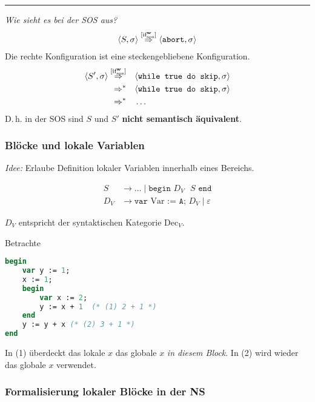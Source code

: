 \begin{lemma}[Determiniertheit]
\begin{example}
    \par\bigskip
    \hrule
    \emph{Wie sieht es bei der SOS aus?}
    \begin{align*}
        \langle S, \sigma \rangle \overset{\infruleSos[\true]{if}}{\Rightarrow} \langle \texttt{abort}, \sigma \rangle
    \end{align*}
    Die rechte Konfiguration ist eine steckengebliebene Konfiguration.
    \begin{align*}
        \langle S', \sigma \rangle \overset{\infruleSos[\true]{if}}{\Rightarrow} & \quad \langle \texttt{while true do skip}, \sigma \rangle \\
        \Rightarrow^* & \quad \langle \texttt{while true do skip}, \sigma \rangle \\
        \Rightarrow^* & \quad \dots
    \end{align*}
    D.\,h. in der SOS sind $S$ und $S'$ \textbf{nicht semantisch äquivalent}.
\end{example}



\subsubsection{Blöcke und lokale Variablen}

\emph{Idee:} Erlaube Definition lokaler Variablen innerhalb eines Bereichs.

\begin{align*}
    S & \to \dots \;\vert\; \texttt{begin $D_V$ $S$ end} \\
    D_V & \to \texttt{var} \text{ Var } \texttt{:= A; $D_V$} \;\vert\; \varepsilon
\end{align*}

$D_V$ entspricht der syntaktischen Kategorie Dec$_V$.

\begin{example}
Betrachte
\begin{lstlisting}[language=Pascal]
begin
    var y := 1;
    x := 1;
    begin
        var x := 2;
        y := x + 1  (* (1) 2 + 1 *)
    end
    y := y + x (* (2) 3 + 1 *)
end
\end{lstlisting}

In (1) überdeckt das lokale $x$ das globale $x$ \emph{in diesem Block}. In (2) wird wieder das globale $x$ verwendet.
\end{example}



\subsubsection{Formalisierung lokaler Blöcke in der NS}


\end{lemma}
